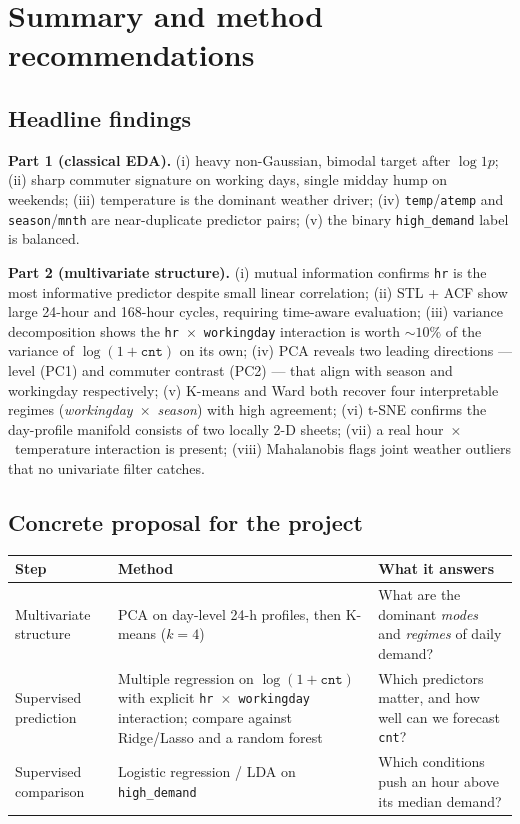 \documentclass[11pt]{article}
\begin{document}
\section{Summary and method recommendations}

\subsection*{Headline findings}

\textbf{Part 1 (classical EDA).}
(i) heavy non-Gaussian, bimodal target after $\log1p$;
(ii) sharp commuter signature on working days, single midday hump on
weekends; (iii) temperature is the dominant weather driver;
(iv) \texttt{temp}/\texttt{atemp} and \texttt{season}/\texttt{mnth}
are near-duplicate predictor pairs; (v) the binary
\texttt{high\_demand} label is balanced.

\textbf{Part 2 (multivariate structure).}
(i) mutual information confirms \texttt{hr} is the most informative
predictor despite small linear correlation;
(ii) STL + ACF show large 24-hour and 168-hour cycles, requiring
time-aware evaluation; (iii) variance decomposition shows the
\texttt{hr}~$\times$~\texttt{workingday} interaction is worth $\sim 10\%$
of the variance of $\log(1+\texttt{cnt})$ on its own;
(iv) PCA reveals two leading directions --- level (PC1) and commuter
contrast (PC2) --- that align with season and workingday respectively;
(v) K-means and Ward both recover four interpretable regimes
(\emph{workingday}~$\times$~\emph{season}) with high agreement;
(vi) t-SNE confirms the day-profile manifold consists of two locally
2-D sheets; (vii) a real hour~$\times$~temperature interaction is
present; (viii) Mahalanobis flags joint weather outliers that no
univariate filter catches.

\subsection*{Concrete proposal for the project}

\begin{center}
\begin{tabular}{p{} p{} p{}}
\toprule
\textbf{Step} & \textbf{Method} & \textbf{What it answers} \\
\midrule
Multivariate structure &
PCA on day-level 24-h profiles, then K-means ($k=4$) &
What are the dominant \emph{modes} and \emph{regimes} of daily demand? \\[6pt]
Supervised prediction &
Multiple regression on $\log(1+\texttt{cnt})$ with explicit
\texttt{hr}~$\times$~\texttt{workingday} interaction; compare against
Ridge/Lasso and a random forest &
Which predictors matter, and how well can we forecast \texttt{cnt}? \\[6pt]
Supervised comparison &
Logistic regression / LDA on \texttt{high\_demand} &
Which conditions push an hour above its median demand? \\
\bottomrule
\end{tabular}
\end{center}
\end{document}
